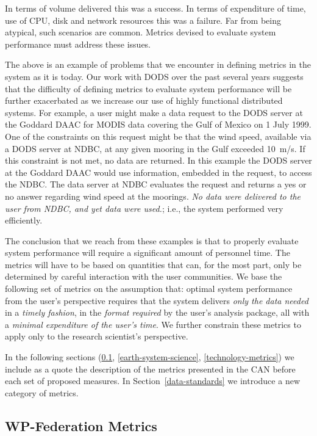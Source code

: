 \documentclass[12pt]{article}
\begin{document}
In terms of volume delivered this was a success. In terms of expenditure of
time, use of CPU, disk and network resources this was a failure. Far from 
being atypical, such scenarios are common. Metrics devised to
evaluate system performance must address these issues.

The above is an example of problems that we encounter in defining metrics in
the system as it is today. Our work with \ac{DODS} over the past several years
suggests that the difficulty of defining metrics to evaluate system
performance will be further exacerbated as we increase our use of highly
functional distributed systems. For example, a user might make a data
request to the \ac{DODS} server at the Goddard \ac{DAAC} for \acs{MODIS} data
covering the Gulf of Mexico on 1 July 1999. One of the constraints on this
request might be that the wind speed, available via a \ac{DODS} server
at \acs{NDBC}, at any given mooring in the Gulf
exceeded 10~m/s.  If this constraint is not met, no data are returned. In
this example the \ac{DODS} server at the Goddard \ac{DAAC} would use
information, embedded in the request, to access the \acs{NDBC}. The data
server at \acs{NDBC} evaluates the request and returns a yes or no answer
regarding wind speed at the moorings. \emph{No data were delivered to the
user from \acs{NDBC}, and yet data were used.}; i.e., the system performed
very efficiently.

The conclusion that we reach from these examples is that to properly evaluate 
system performance will require a significant amount of personnel time. The 
metrics will have to be based on quantities
that can, for the most part, only be determined by careful interaction with
the user communities. We base the following set of metrics on the 
assumption that: optimal system performance from the user's perspective
requires that the system delivers \emph{only the data needed} in a
\emph{timely fashion}, in the \emph{format required} by the user's analysis
package, all with a \emph{minimal expenditure of the user's time}. We further
constrain these metrics to apply only to the research scientist's perspective.

In the following sections (\ref{federation-metrics},
\ref{earth-system-science}, \ref{technology-metrics}) we include as a quote
the description of the metrics presented in the CAN before each set of 
proposed measures. In Section~\ref{data-standards} we introduce a new 
category of metrics.

\subsection{WP-Federation Metrics}\label{federation-metrics}
\end{document}
